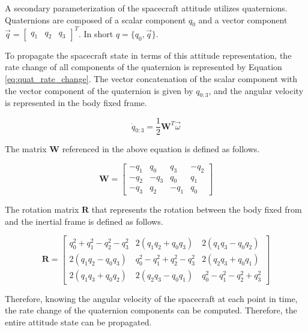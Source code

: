 A secondary parameterization of the spacecraft attitude utilizes quaternions. Quaternions are composed of a scalar component $q_0$ and a vector component $\vec{q} = \begin{bmatrix}  q_1 & q_2 & q_3  \end{bmatrix}^T$. In short $q = \{q_0, \vec{q}\}$. 

To propagate the spacecraft state in terms of this attitude representation, the rate change of all components of the quaternion is represented by Equation \ref{eq:quat_rate_change}. The vector concatenation of the scalar component with the vector component of the quaternion is given by $q_{0:3}$, and the angular velocity is represented in the body fixed frame.

\begin{equation} \label{eq:quat_rate_change}
    \dot{q}_{0:3} = \frac{1}{2} \boldsymbol{W}^T \vec{\omega}
\end{equation}

The matrix $\boldsymbol{W}$ referenced in the above equation is defined as follows.

\begin{equation*}
    \boldsymbol{W} = \begin{bmatrix}
        -q_1 & q_0 & q_3 & -q_2 \\
        -q_2 & -q_3 & q_0 & q_1 \\
        -q_3 & q_2 & -q_1 & q_0
    \end{bmatrix}
\end{equation*}

The rotation matrix $\boldsymbol{R}$ that represents the rotation between the body fixed from and the inertial frame is defined as follows.

\begin{equation*}
    \boldsymbol{R} = \begin{bmatrix}
        q_0^2 + q_1^2 - q_2^2 - q_3^2 & 2(q_1q_2 + q_0q_3) & 2(q_1q_3 - q_0q_2) \\
        2(q_1q_2 - q_0q_3) & q_0^2 - q_1^2 + q_2^2 - q_3^2 & 2(q_2q_3 + q_0q_1) \\
        2(q_1q_3 + q_0q_2) & 2(q_2q_3 - q_0q_1) & q_0^2 - q_1^2 - q_2^2 + q_3^2
    \end{bmatrix}
\end{equation*}

Therefore, knowing the angular velocity of the spacecraft at each point in time, the rate change of the quaternion components can be computed. Therefore, the entire attitude state can be propagated.

